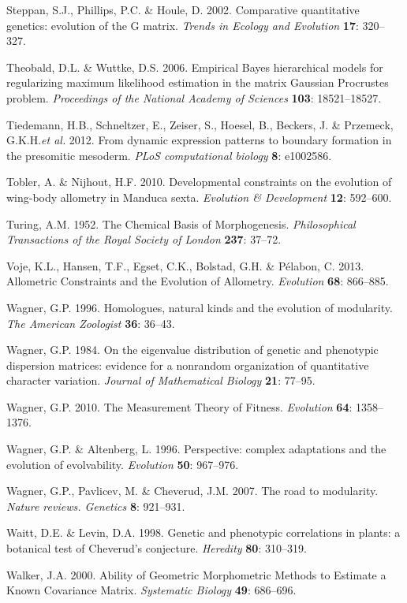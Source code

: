 \documentclass[12pt,twoside]{report}
\begin{document}
Steppan, S.J., Phillips, P.C. \& Houle, D. 2002. Comparative
quantitative genetics: evolution of the G matrix. \emph{Trends in
Ecology and Evolution} \textbf{17}: 320--327.

Theobald, D.L. \& Wuttke, D.S. 2006. Empirical Bayes hierarchical models
for regularizing maximum likelihood estimation in the matrix Gaussian
Procrustes problem. \emph{Proceedings of the National Academy of
Sciences} \textbf{103}: 18521--18527.

Tiedemann, H.B., Schneltzer, E., Zeiser, S., Hoesel, B., Beckers, J. \&
Przemeck, G.K.H.\emph{et al.} 2012. From dynamic expression patterns to
boundary formation in the presomitic mesoderm. \emph{PLoS computational
biology} \textbf{8}: e1002586.

Tobler, A. \& Nijhout, H.F. 2010. Developmental constraints on the
evolution of wing-body allometry in Manduca sexta. \emph{Evolution \&
Development} \textbf{12}: 592--600.

Turing, A.M. 1952. The Chemical Basis of Morphogenesis.
\emph{Philosophical Transactions of the Royal Society of London}
\textbf{237}: 37--72.

Voje, K.L., Hansen, T.F., Egset, C.K., Bolstad, G.H. \& Pélabon, C.
2013. Allometric Constraints and the Evolution of Allometry.
\emph{Evolution} \textbf{68}: 866--885.

Wagner, G.P. 1996. Homologues, natural kinds and the evolution of
modularity. \emph{The American Zoologist} \textbf{36}: 36--43.

Wagner, G.P. 1984. On the eigenvalue distribution of genetic and
phenotypic dispersion matrices: evidence for a nonrandom organization of
quantitative character variation. \emph{Journal of Mathematical Biology}
\textbf{21}: 77--95.

Wagner, G.P. 2010. The Measurement Theory of Fitness. \emph{Evolution}
\textbf{64}: 1358--1376.

Wagner, G.P. \& Altenberg, L. 1996. Perspective: complex adaptations and
the evolution of evolvability. \emph{Evolution} \textbf{50}: 967--976.

Wagner, G.P., Pavlicev, M. \& Cheverud, J.M. 2007. The road to
modularity. \emph{Nature reviews. Genetics} \textbf{8}: 921--931.

Waitt, D.E. \& Levin, D.A. 1998. Genetic and phenotypic correlations in
plants: a botanical test of Cheverud's conjecture. \emph{Heredity}
\textbf{80}: 310--319.

Walker, J.A. 2000. Ability of Geometric Morphometric Methods to Estimate
a Known Covariance Matrix. \emph{Systematic Biology} \textbf{49}:
686--696.
\end{document}
